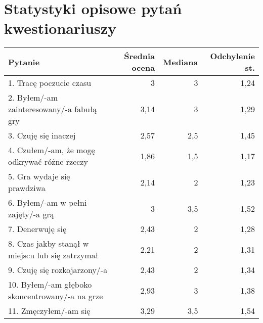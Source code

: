 \graphicspath{{appendices/imgs/}}
\chapter{Statystyki opisowe pytań kwestionariuszy}\label{appendix:B}

\begin{table}[h!]
    \begin{center}
        \begin{tabular}{|m{12em}|r|r|r|}
            \hline
            Pytanie                                                           & Średnia ocena & Mediana & Odchylenie st. \\
            \hline
            1. Tracę poczucie czasu                                           & 3             & 3       & 1,24           \\
            2. Byłem/-am \newline zainteresowany/-a fabułą gry                & 3,14          & 3       & 1,29           \\
            3. Czuję się inaczej                                              & 2,57          & 2,5     & 1,45           \\
            4. Czułem/-am, że mogę odkrywać różne rzeczy                      & 1,86          & 1,5     & 1,17           \\
            5. Gra wydaje się prawdziwa                                       & 2,14          & 2       & 1,23           \\
            6. Byłem/-am \newline w pełni zajęty/-a grą                       & 3             & 3,5     & 1,52           \\
            7. Denerwuję się                                                  & 2,43          & 2       & 1,28           \\
            8. Czas jakby stanął w miejscu lub się zatrzymał                  & 2,21          & 2       & 1,31           \\
            9. Czuję się \newline rozkojarzony/-a                             & 2,43          & 2       & 1,34           \\
            10. Byłem/-am głęboko \newline skoncentrowany/-a \newline na grze & 2,93          & 3       & 1,38           \\
            11. Zmęczyłem/-am się                                             & 3,29          & 3,5     & 1,54           \\

\end{tabular}
\end{center}
\end{table}

